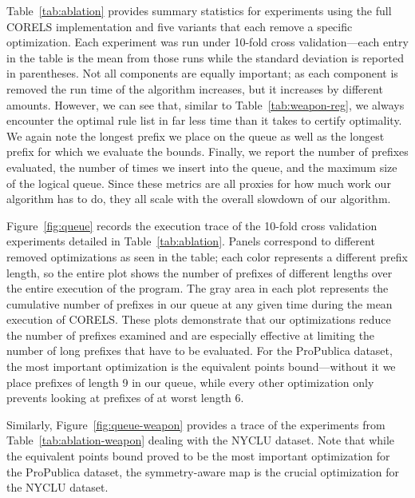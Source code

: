 Table~\ref{tab:ablation} provides summary statistics for experiments using the full
CORELS implementation and five variants that each remove a specific optimization.
%
Each experiment was run under 10-fold cross validation---each entry in the table is the mean from those 
runs while the standard deviation is reported in parentheses. 
%
Not all components are equally important; as each component is removed the run time of the algorithm increases,
but it increases by different amounts.
%
However, we can see that, similar to Table~\ref{tab:weapon-reg}, we always encounter the optimal rule list in far less
time than it takes to certify optimality.
%
We again note the longest prefix we place on the queue as well as the longest prefix for which we evaluate the bounds.
%
Finally, we report the number of prefixes evaluated, the number of times we insert into the queue, and the maximum size
of the logical queue.
%
Since these metrics are all proxies for how much work our algorithm has to do, they all scale with the overall slowdown 
of our algorithm.

Figure~\ref{fig:queue} records the execution trace of the 10-fold cross validation experiments detailed in Table~\ref{tab:ablation}.
%
Panels correspond to different removed optimizations as seen in the table; each color represents a different prefix length,
so the entire plot shows the number of prefixes of different lengths over the entire execution of the program.
%
The gray area in each plot represents the cumulative number of prefixes in our queue at any given time during the mean execution
of CORELS.
%
These plots demonstrate that our optimizations reduce the number of prefixes examined and are especially effective at 
limiting the number of long prefixes that have to be evaluated.
%
For the ProPublica dataset, the most important optimization is the equivalent points bound---without it we place prefixes of 
length 9 in our queue, while every other optimization only prevents looking at prefixes of at worst length 6.

Similarly, Figure~\ref{fig:queue-weapon} provides a trace of the experiments from Table~\ref{tab:ablation-weapon} dealing with the NYCLU dataset.
%
Note that while the equivalent points bound proved to be the most important optimization for the ProPublica dataset,
the symmetry-aware map is the crucial optimization for the NYCLU dataset.

